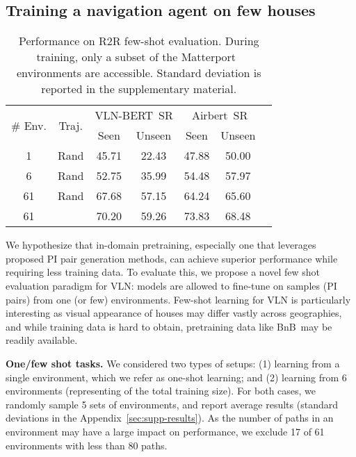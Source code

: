 \RequirePackage[dvipsnames,table]{xcolor} \documentclass[10pt,twocolumn,letterpaper]{article}
\newcommand{\p}[1]{\vspace{1mm}\noindent\textbf{#1}}
\newcommand{\vlnbert}{VLN-BERT}
\newcommand{\airbert}{Airbert}
\newcommand{\airbnb}{BnB}
\begin{document}
\subsection{Training a navigation agent on few houses}
\label{sec:eval:fsl}
\begin{table}[t]
\centering
\small
\tabcolsep=0.14cm
\begin{tabular}{ccc cc cc}
\toprule
\multirow{2}{*}{\# Env.} &
\multirow{2}{*}{Traj.} & 
\multicolumn{2}{c}{\vlnbert~SR} &
\multicolumn{2}{c}{\airbert~SR}\\ 
& & Seen & Unseen & Seen & Unseen \\ 
\midrule
1  & Rand 
    & 45.71 & 22.43
    & 47.88 & 50.00 \\
\midrule
6  & Rand
    & 52.75 & 35.99
    & 54.48 & 57.97 \\
\midrule
61 & Rand
    & 67.68 & 57.15
    & 64.24 & 65.60 \\
61 & \cite{tan2019envdrop}
    & 70.20 & 59.26
    & 73.83 & 68.48 \\
\bottomrule
\end{tabular}
\vspace{-2mm}
\caption{Performance on R2R few-shot evaluation.
During training, only a subset of the Matterport~\cite{Matterport3D} environments are accessible.
Standard deviation is reported in the supplementary material.}
\vspace{-4mm}
\label{tab:fsl}
\end{table}



%
 
We hypothesize that in-domain pretraining, especially one that leverages proposed PI pair generation methods, can achieve superior performance while requiring less training data.
To evaluate this, we propose a novel few shot evaluation paradigm for VLN: models are allowed to fine-tune on samples (PI pairs) from one (or few) environments.
Few-shot learning for VLN is particularly interesting as visual appearance of houses may differ vastly across geographies, and while training data is hard to obtain, pretraining data like \airbnb~may be readily available.



\p{One/few shot tasks.}
We considered two types of setups:
(1) learning from a single environment, which we refer as one-shot learning; and
(2) learning from 6 environments (representing  of the total training size).
For both cases, we randomly sample 5 sets of environments, and report average results (standard deviations in the Appendix~\ref{sec:supp-results}).
As the number of paths in an environment may have a large impact on performance, we exclude 17 of 61 environments with less than 80 paths.
\end{document}
